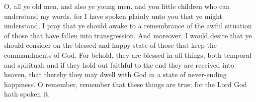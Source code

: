 O, all ye old men, and also ye young men, and you little children who can understand my words, for I have spoken plainly unto you that ye might understand, I pray that ye should awake to a remembrance of the awful situation of those that have fallen into transgression.
\bverse \iffalse And moreover, I would desire that ye should consider on the blessed and happy state of those that keep the commandments of God. For behold, they are blessed in all things, both temporal and spiritual; and if they hold out faithful to the end they are received into heaven, that thereby they may dwell with God in a state of never-ending happiness. O remember, remember that these things are true; for the Lord God hath spoken it. \fi
And moreover, I would desire that ye should consider on the blessed and happy state of those that keep the commandments of God. For behold, they are blessed in all things, both temporal and spiritual; and if they hold out faithful to the end they are received into heaven, that thereby they may dwell with God in a state of never-ending happiness. O remember, remember that these things are true; for the Lord God hath spoken it.

